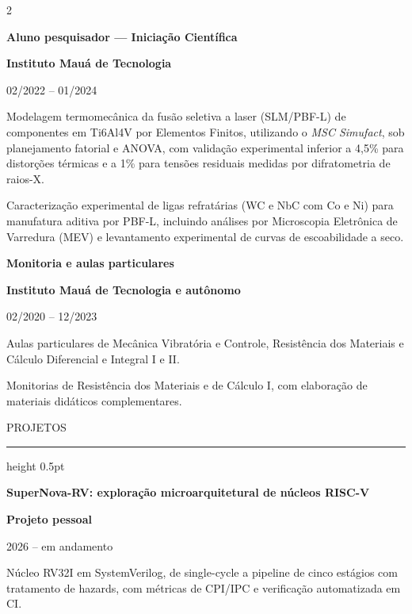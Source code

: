 \documentclass[10pt,a4paper]{article}
\newcommand{\secao}[1]{%
  \Needspace*{6\baselineskip}%
  \vspace{4pt}%
  {\display\fontsize{9.6}{9.6}\selectfont\color{tinta}%
   \addfontfeature{LetterSpace=13}\MakeUppercase{#1}}\par
  \vspace{1.8pt}%
  {\color{filete}\hrule height 0.5pt}%
  \nopagebreak\vspace{6.5pt}%
  \nopagebreak%
}
\newcommand{\cargo}[1]{{\fontsize{9.5}{11.0}\selectfont\bfseries\color{tinta}#1}\par}
\newcommand{\org}[1]{{\fontsize{8.7}{10.0}\selectfont\bfseries\color{meio}#1}\par}
\newcommand{\periodo}[1]{{\fontsize{8.1}{9.4}\selectfont\color{claro}#1}\par\vspace{1pt}}
\newcommand{\espaco}{\vspace{5pt}}
\newcommand{\bloco}[3]{\par\noindent\begin{minipage}{\linewidth}%
  \cargo{#1}\org{#2}\periodo{#3}\end{minipage}\nopagebreak\vspace{1.5pt}}
\begin{document}
\begin{paracol}{2}
\vspace{7pt}
\bloco{Aluno pesquisador — Iniciação Científica}{Instituto Mauá de Tecnologia}{02/2022 – 01/2024}
\begin{itens}

\item Modelagem termomecânica da fusão seletiva a laser (SLM/PBF-L) de componentes em Ti6Al4V por Elementos Finitos, utilizando o \textit{MSC Simufact}, sob planejamento fatorial e ANOVA, com validação experimental inferior a 4,5\% para distorções térmicas e a 1\% para tensões residuais medidas por difratometria de raios-X.

\item Caracterização experimental de ligas refratárias (WC e NbC com Co e Ni) para manufatura aditiva por PBF-L, incluindo análises por Microscopia Eletrônica de Varredura (MEV) e levantamento experimental de curvas de escoabilidade a seco.

\end{itens}

\vspace{7pt}
\bloco{Monitoria e aulas particulares}{Instituto Mauá de Tecnologia e autônomo}{02/2020 – 12/2023}
\begin{itens}
  \item Aulas particulares de Mecânica Vibratória e Controle, Resistência dos Materiais e Cálculo Diferencial e Integral I e II.
  \item Monitorias de Resistência dos Materiais e de Cálculo I, com elaboração de materiais didáticos complementares.
\end{itens}

\espaco
\secao{Projetos}

\bloco{SuperNova-RV: exploração microarquitetural de núcleos RISC-V}{Projeto pessoal}{2026 – em andamento}
\begin{itens}
  \item Núcleo RV32I em SystemVerilog, de single-cycle a pipeline de cinco estágios com tratamento de hazards, com métricas de CPI/IPC e verificação automatizada em CI.
\end{itens}


\end{paracol}
\end{document}
